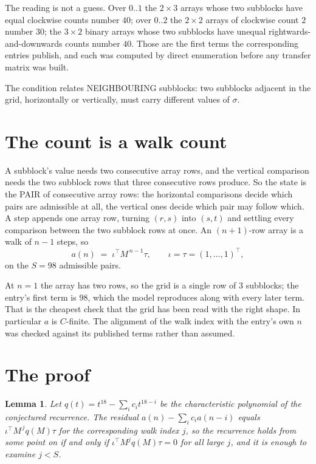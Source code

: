 \documentclass[11pt,a4paper]{article}
\theoremstyle{plain}
\newtheorem{lemma}[theorem]{Lemma}
\theoremstyle{definition}
\begin{document}
The reading is not a guess. Over $0..1$ the $2\times3$ arrays whose two subblocks have equal
clockwise counts number $40$; over $0..2$ the $2\times2$ arrays of clockwise count $2$ number
$30$; the $3\times2$ binary arrays whose two subblocks have unequal rightwards-and-downwards
counts number $40$. Those are the first terms the corresponding entries publish, and each was
computed by direct enumeration before any transfer matrix was built.

The condition relates NEIGHBOURING subblocks: two subblocks adjacent in the grid, horizontally
or vertically, must carry different values of $\sigma$.

\section{The count is a walk count}

A subblock's value needs two consecutive array rows, and the vertical
comparison needs the two subblock rows that three consecutive rows produce. So the state is the
PAIR of consecutive array rows: the horizontal comparisons decide which pairs are admissible at
all, the vertical ones decide which pair may follow which. A step appends one array row,
turning $(r,s)$ into $(s,t)$ and settling every comparison between the two subblock rows at
once. An $(n+1)$-row array is a walk of $n-1$ steps, so
\[
a(n)\;=\;\iota^{\!\top}M^{\,n-1}\tau,\qquad\iota=\tau=(1,\dots,1)^{\!\top},
\]
on the $S=98$ admissible pairs.

At $n=1$ the array has two rows, so the grid is a single row of $3$
subblocks; the entry's first term is $98$, which the model
reproduces along with every later term. That is the cheapest check that the grid has been read
with the right shape.
In particular $a$ is $C$-finite. The alignment of the walk index with the entry's own $n$ was
checked against its published terms rather than assumed.

\section{The proof}

\begin{lemma}\label{lem:crit}
Let $q(t)=t^{18}-\sum_i c_it^{18-i}$ be the characteristic polynomial of the
conjectured recurrence. The residual $a(n)-\sum_ic_ia(n-i)$ equals
$\iota^{\!\top}M^{\,j}q(M)\tau$ for the corresponding walk index $j$, so the recurrence
holds from some point on if and only if $\iota^{\!\top}M^{j}q(M)\tau=0$ for all large $j$,
and it is enough to examine $j<S$.
\end{lemma}
\end{document}
